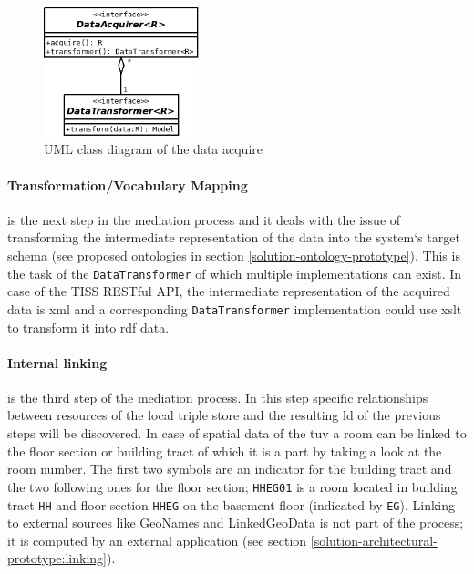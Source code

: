 \documentclass[draft,final]{vutinfth} %
\begin{document}
\begin{figure}[h]
    \centering
    \includegraphics[width=0.4\textwidth]{graphics/solution/architecture/dataacquirer.png}
    \caption{UML class diagram of the data acquire}
    \label{fig:solution-architectural-prototype:acquirer-uml-class-dia}
\end{figure}

\paragraph{Transformation/Vocabulary Mapping} is the next step in the mediation process and it deals with the issue of transforming the intermediate representation of the data into the system`s target schema (see proposed ontologies in section \ref{solution-ontology-prototype}). This is the task of the \texttt{DataTransformer} of which multiple implementations can exist. In case of the TISS RESTful API, the intermediate representation of the acquired data is \gls{xml} and a corresponding \texttt{DataTransformer} implementation could use \gls{xslt} to transform it into \gls{rdf} data.

\paragraph{Internal linking} is the third step of the mediation process. In this step specific relationships between resources of the local triple store and the resulting \gls{ld} of the previous steps will be discovered. In case of spatial data of the \gls{tuv} a room can be linked to the floor section or building tract of which it is a part by taking a look at the room number. The first two symbols are an indicator for the building tract and the two following ones for the floor section; \texttt{HHEG01} is a room located in building tract \texttt{HH} and floor section \texttt{HHEG} on the basement floor (indicated by \texttt{EG}). Linking to external sources like GeoNames and LinkedGeoData is not part of the process; it is computed by an external application (see section \ref{solution-architectural-prototype:linking}).  
\end{document}
